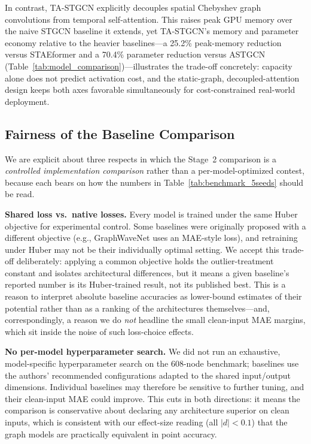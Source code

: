 \documentclass[a4paper,fleqn]{cas-sc}
\begin{document}
In contrast, TA-STGCN explicitly decouples spatial Chebyshev graph convolutions from temporal self-attention. This raises peak GPU memory over the naive STGCN baseline it extends, yet TA-STGCN's memory and parameter economy relative to the heavier baselines---a 25.2\% peak-memory reduction versus STAEformer and a 70.4\% parameter reduction versus ASTGCN (Table~\ref{tab:model_comparison})---illustrates the trade-off concretely: capacity alone does not predict activation cost, and the static-graph, decoupled-attention design keeps both axes favorable simultaneously for cost-constrained real-world deployment.

\subsection{Fairness of the Baseline Comparison}
We are explicit about three respects in which the Stage~2 comparison is a \emph{controlled implementation comparison} rather than a per-model-optimized contest, because each bears on how the numbers in Table~\ref{tab:benchmark_5seeds} should be read.

\textbf{Shared loss vs.\ native losses.} Every model is trained under the same Huber objective for experimental control. Some baselines were originally proposed with a different objective (e.g., GraphWaveNet uses an MAE-style loss), and retraining under Huber may not be their individually optimal setting. We accept this trade-off deliberately: applying a common objective holds the outlier-treatment constant and isolates architectural differences, but it means a given baseline's reported number is its Huber-trained result, not its published best. This is a reason to interpret absolute baseline accuracies as lower-bound estimates of their potential rather than as a ranking of the architectures themselves---and, correspondingly, a reason we do \emph{not} headline the small clean-input MAE margins, which sit inside the noise of such loss-choice effects.

\textbf{No per-model hyperparameter search.} We did not run an exhaustive, model-specific hyperparameter search on the 608-node benchmark; baselines use the authors' recommended configurations adapted to the shared input/output dimensions. Individual baselines may therefore be sensitive to further tuning, and their clean-input MAE could improve. This cuts in both directions: it means the comparison is conservative about declaring any architecture superior on clean inputs, which is consistent with our effect-size reading (all $|d|<0.1$) that the graph models are practically equivalent in point accuracy.
\end{document}
